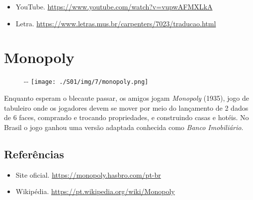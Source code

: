 \begin{itemize}
\tightlist
\item
  \sloppy YouTube. \url{https://www.youtube.com/watch?v=vupwAFMXLkA}
\item
  \sloppy Letra. \url{https://www.letras.mus.br/carpenters/7023/traducao.html}
\end{itemize}

\hypertarget{monopoly}{%
\section{Monopoly}\label{monopoly}}

\begin{figure}[!ht]
  \begin{adjustwidth}{-\oddsidemargin-1in}{-\rightmargin}
    \centering
    \texttt{[image: ./S01/img/7/monopoly.png]}
  \end{adjustwidth}
\end{figure}

Enquanto esperam o blecaute passar, os amigos jogam \emph{Monopoly}
(1935), jogo de tabuleiro onde os jogadores devem se mover por meio do
lançamento de 2 dados de 6 faces, comprando e trocando propriedades, e
construindo casas e hotéis. No Brasil o jogo ganhou uma versão adaptada
conhecida como \emph{Banco Imobiliário}.

\hypertarget{referuxeancias-2}{%
\subsection{Referências}\label{referuxeancias-2}}

\begin{itemize}
\tightlist
\item
  \sloppy Site oficial. \url{https://monopoly.hasbro.com/pt-br}
\item
  \sloppy Wikipédia. \url{https://pt.wikipedia.org/wiki/Monopoly}
\end{itemize}
